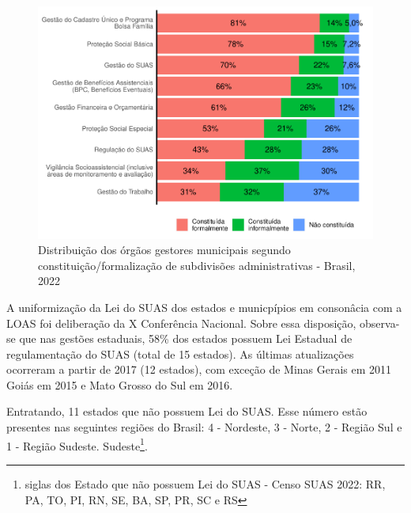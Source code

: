 \documentclass[
  brazilian]{report}
\begin{document}
\begin{figure}
\includegraphics{Censo-SUAS-2022_files/figure-latex/municipais-constituicao-subdivisoes-1} \caption[Distribuição dos órgãos gestores municipais segundo constituição/formalização de subdivisões administrativas - Brasil, 2022]{Distribuição dos órgãos gestores municipais segundo constituição/formalização de subdivisões administrativas - Brasil, 2022}\label{fig:municipais-constituicao-subdivisoes}
\end{figure}

A uniformização da Lei do SUAS dos estados e municpípios em consonâcia
com a LOAS foi deliberação da X Conferência Nacional. Sobre essa
disposição, observa-se que nas gestões estaduais, 58\% dos estados
possuem Lei Estadual de regulamentação do SUAS (total de 15 estados). As
últimas atualizações ocorreram a partir de 2017 (12 estados), com
exceção de Minas Gerais em 2011 Goiás em 2015 e Mato Grosso do Sul em
2016.

Entratando, 11 estados que não possuem Lei do SUAS. Esse número estão
presentes nas seguintes regiões do Brasil: 4 - Nordeste, 3 - Norte, 2 -
Região Sul e 1 - Região Sudeste.
Sudeste\footnote{siglas dos Estado que não possuem Lei do SUAS - Censo SUAS 2022: RR, PA, TO, PI, RN, SE, BA, SP, PR, SC e RS}.
\end{document}
